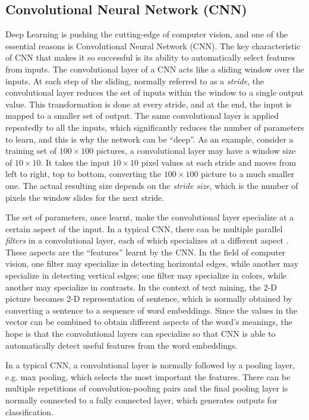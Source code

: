 \subsection{Convolutional Neural Network (CNN)}

Deep Learning is pushing the cutting-edge of computer vision, and one of the essential reasons is Convolutional Neural Network (CNN). The key characteristic of CNN that makes it so successful is its ability to automatically select features from inputs. The convolutional layer of a CNN acts like a sliding window over the inputs. At each step of the sliding, normally referred to as a {\em stride}, the convolutional layer reduces the set of inputs within the window to a single output value. This transformation is done at every stride, and at the end, the input is mapped to a smaller set of output. The same convolutional layer is applied repeatedly to all the inputs, which significantly reduces the number of parameters to learn, and this is why the network can be ``deep''. As an example, consider a training set of $100 \times 100$ pictures, a convolutional layer may have a window size of $10 \times 10$. It takes the input $10 \times 10$ pixel values at each stride and moves from left to right, top to bottom, converting the $100 \times 100$ picture to a much smaller one. The actual resulting size depends on the {\em stride size}, which is the number of pixels the window slides for the next stride. 

The set of parameters, once learnt, make the convolutional layer specialize at a certain aspect of the input. In a typical CNN, there can be multiple parallel {\em filters} in a convolutional layer, each of which specializes at a different aspect \cite{krizhevsky2012}. These aspects are the ``features'' learnt by the CNN. In the field of computer vision, one filter may specialize in detecting horizontal edges, while another may specialize in detecting vertical edges; one filter may specialize in colors, while another may specialize in contrasts. In the context of text mining, the 2-D picture becomes 2-D representation of sentence, which is normally obtained by converting a sentence to a sequence of word embeddings. Since the values in the vector can be combined to obtain different aspects of the word's meanings, the hope is that the convolutional layers can specialize so that CNN is able to automatically detect useful features from the word embeddings. 

In a typical CNN, a convolutional layer is normally followed by a pooling layer, e.g. max pooling, which selects the most important the features. There can be multiple repetitions of convolution-pooling pairs and the final pooling layer is normally connected to a fully connected layer, which generates outputs for classification. 
